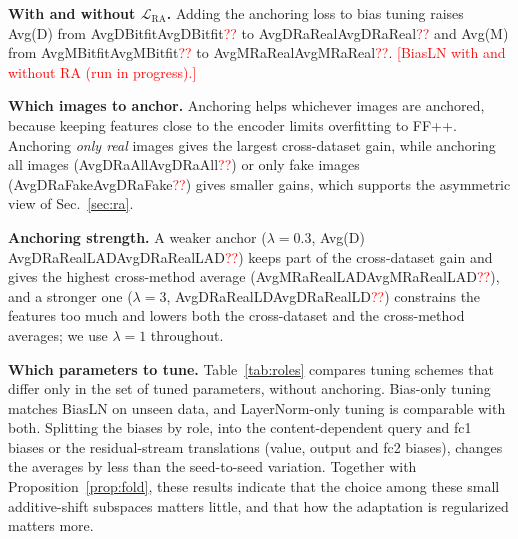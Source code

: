 \documentclass[fonts]{icst}
\newif\ifpending\pendingtrue
\newcommand{\pending}[1]{\ifpending\textcolor{red}{[#1]}\else\errmessage{pending text left: #1}\fi}
\newcommand{\num}[1]{\ifcsname #1\endcsname\csname #1\endcsname\else\textcolor{red}{??}\fi}
\begin{document}
\noindent\textbf{With and without $\mathcal{L}_{\mathrm{RA}}$.}
Adding the anchoring loss to bias tuning raises Avg(D) from \num{AvgDBitfit} to \num{AvgDRaReal} and Avg(M) from \num{AvgMBitfit} to \num{AvgMRaReal}. \pending{BiasLN with and without RA (run in progress).}

\noindent\textbf{Which images to anchor.}
Anchoring helps whichever images are anchored, because keeping features close to the encoder limits overfitting to FF++. Anchoring \emph{only real} images gives the largest cross-dataset gain, while anchoring all images (\num{AvgDRaAll}) or only fake images (\num{AvgDRaFake}) gives smaller gains, which supports the asymmetric view of Sec.~\ref{sec:ra}.

\noindent\textbf{Anchoring strength.}
A weaker anchor ($\lambda=0.3$, Avg(D) \num{AvgDRaRealLAD}) keeps part of the cross-dataset gain and gives the highest cross-method average (\num{AvgMRaRealLAD}), and a stronger one ($\lambda=3$, \num{AvgDRaRealLD}) constrains the features too much and lowers both the cross-dataset and the cross-method averages; we use $\lambda=1$ throughout.

\noindent\textbf{Which parameters to tune.}
\label{sec:roles}
Table~\ref{tab:roles} compares tuning schemes that differ only in the set of tuned parameters, without anchoring. Bias-only tuning matches BiasLN on unseen data, and LayerNorm-only tuning is comparable with both. Splitting the biases by role, into the content-dependent query and fc1 biases or the residual-stream translations (value, output and fc2 biases), changes the averages by less than the seed-to-seed variation. Together with Proposition~\ref{prop:fold}, these results indicate that the choice among these small additive-shift subspaces matters little, and that how the adaptation is regularized matters more.

\begin{table}[t]
\centering
\captionsetup{labelsep=period, labelfont=bf, hypcap=false}
\caption{Which parameters to tune (no anchoring). Only the tuned subset of the encoder differs. Video AUC, mean $\pm$ std over $n$ seeds.}
\label{tab:roles}
\resizebox{\columnwidth}{!}{}
\end{table}
\end{document}
